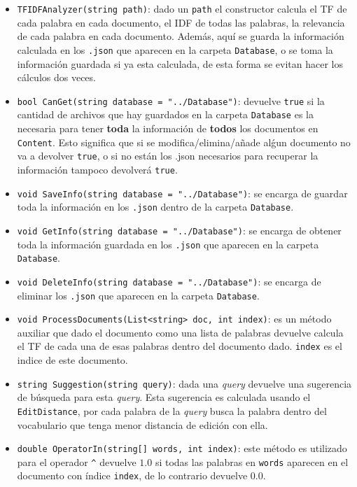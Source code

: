 \documentclass[a4paper, 12pt]{article}
\begin{document}
\begin{itemize}
	\item {\tt TFIDFAnalyzer(string path)}: dado un {\tt path} el constructor calcula el TF
	      de cada palabra en cada documento, el IDF de todas las palabras, la relevancia de cada
	      palabra en cada documento. Además, aquí se guarda la información calculada en los
		      {\tt .json} que aparecen en la carpeta {\tt Database}, o se toma la información guardada
	      si ya esta calculada, de esta forma se evitan hacer los cálculos dos veces.
	\item {\tt bool CanGet(string database = "../Database")}: devuelve {\tt true} si la cantidad
	      de archivos que hay guardados en la carpeta {\tt Database} es la necesaria para tener {\bf toda}
	      la información de {\bf todos} los documentos en {\tt Content}. Esto significa que si se modifica/elimina/a\~nade
	      al\'gun documento no va a devolver {\tt true}, o si no están los {.json} necesarios
	      para recuperar la información tampoco devolverá {\tt true}.
	\item {\tt void SaveInfo(string database = "../Database")}: se encarga de guardar toda la información en los {\tt .json} dentro de la carpeta {\tt Database}.
	\item {\tt void GetInfo(string database = "../Database")}: se encarga de obtener toda la información guardada en los {\tt .json} que aparecen en la carpeta {\tt Database}.
	\item {\tt void DeleteInfo(string database = "../Database")}: se encarga de eliminar los {\tt .json} que aparecen en la carpeta {\tt Database}.
	\item {\tt void ProcessDocuments(List<string> doc, int index)}: es un método auxiliar que dado el documento como una lista de palabras devuelve calcula el TF de cada una de esas
	      palabras dentro del documento dado. {\tt index} es el indice de este documento.
	\item {\tt string Suggestion(string query)}: dada una {\it query} devuelve una sugerencia de búsqueda para esta {\it query}. Esta sugerencia es calculada
	      usando el {\tt EditDistance}, por cada palabra de la {\it query} busca la palabra dentro del vocabulario que tenga menor distancia de edición con ella.
	\item {\tt double OperatorIn(string[] words, int index)}: este método es utilizado para el operador {\tt \^{}} devuelve $1.0$ si todas las palabras en {\tt words}
	      aparecen en el documento con índice {\tt index}, de lo contrario devuelve $0.0$.

\end{itemize}
\end{document}
